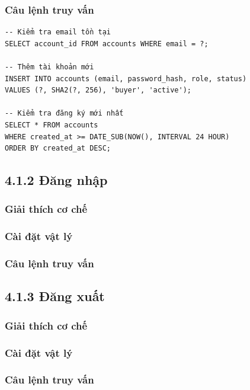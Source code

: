 \subsubsection{Câu lệnh truy vấn}

\begin{verbatim}
-- Kiểm tra email tồn tại
SELECT account_id FROM accounts WHERE email = ?;

-- Thêm tài khoản mới
INSERT INTO accounts (email, password_hash, role, status)
VALUES (?, SHA2(?, 256), 'buyer', 'active');

-- Kiểm tra đăng ký mới nhất
SELECT * FROM accounts 
WHERE created_at >= DATE_SUB(NOW(), INTERVAL 24 HOUR)
ORDER BY created_at DESC;
\end{verbatim}

\subsection{4.1.2 Đăng nhập}

\subsubsection{Giải thích cơ chế}

\subsubsection{Cài đặt vật lý}

\subsubsection{Câu lệnh truy vấn}

\subsection{4.1.3 Đăng xuất}

\subsubsection{Giải thích cơ chế}

\subsubsection{Cài đặt vật lý}

\subsubsection{Câu lệnh truy vấn}

